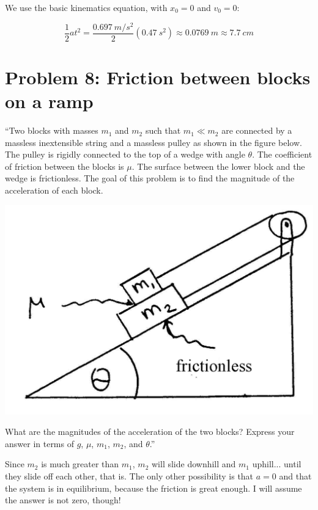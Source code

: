 \documentclass[12pt,a4paper]{report}
\begin{document}
We use the basic kinematics equation, with $x_0 = 0$ and $v_0 = 0$:

\begin{equation}
\frac{1}{2} a t^2 = \frac{\SI{0.697}{m/s^2}}{2} (\SI{0.47}{s^2}) \approx \SI{0.0769}{m} \approx \SI{7.7}{cm}
\end{equation}

\section{Problem 8: Friction between blocks on a ramp}

``Two blocks with masses $m_1$ and $m_2$ such that $m_1 \ll m_2$ are connected by a massless inextensible string and a massless pulley as shown in the figure below. The pulley is rigidly connected to the top of a wedge with angle $\theta$. The coefficient of friction between the blocks is $\mu$. The surface between the lower block and the wedge is frictionless. The goal of this problem is to find the magnitude of the acceleration of each block.

\begin{center}
\includegraphics[scale=1.0]{Graphics/h3p8}
\end{center}

What are the magnitudes of the acceleration of the two blocks? Express your answer in terms of $g$, $\mu$, $m_1$, $m_2$, and $\theta$.''

Since $m_2$ is much greater than $m_1$, $m_2$ will slide downhill and $m_1$ uphill... until they slide off each other, that is. The only other possibility is that $a = 0$ and that the system is in equilibrium, because the friction is great enough. I will assume the answer is not zero, though!
\end{document}
